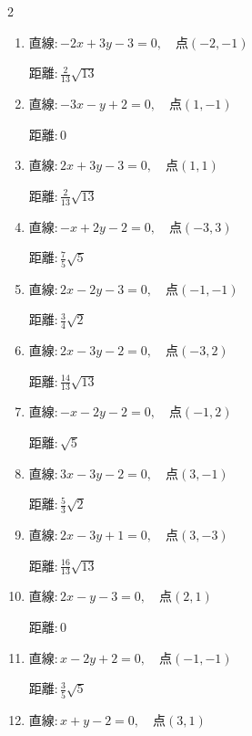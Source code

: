 \begin{multicols}{2}
\begin{enumerate}
        $\displaystyle 距離 : \frac{10}{13}\sqrt{13}$

  \item $直線:-2x+3y-3=0,\quad 点 ( -2, -1 )$

        $\displaystyle 距離 : \frac{2}{13}\sqrt{13}$

  \item $直線:-3x-y+2=0,\quad 点 ( 1, -1 )$

        $\displaystyle 距離 : 0$

\columnbreak %

\resetques

  \item $直線:2x+3y-3=0,\quad 点 ( 1, 1 )$

        $\displaystyle 距離 : \frac{2}{13}\sqrt{13}$

  \item $直線:-x+2y-2=0,\quad 点 ( -3, 3 )$

        $\displaystyle 距離 : \frac{7}{5}\sqrt{5}$

  \item $直線:2x-2y-3=0,\quad 点 ( -1, -1 )$

        $\displaystyle 距離 : \frac{3}{4}\sqrt{2}$

  \item $直線:2x-3y-2=0,\quad 点 ( -3, 2 )$

        $\displaystyle 距離 : \frac{14}{13}\sqrt{13}$

  \item $直線:-x-2y-2=0,\quad 点 ( -1, 2 )$

        $\displaystyle 距離 : \sqrt{5}$

  \item $直線:3x-3y-2=0,\quad 点 ( 3, -1 )$

        $\displaystyle 距離 : \frac{5}{3}\sqrt{2}$

  \item $直線:2x-3y+1=0,\quad 点 ( 3, -3 )$

        $\displaystyle 距離 : \frac{16}{13}\sqrt{13}$

  \item $直線:2x-y-3=0,\quad 点 ( 2, 1 )$

        $\displaystyle 距離 : 0$

  \item $直線:x-2y+2=0,\quad 点 ( -1, -1 )$

        $\displaystyle 距離 : \frac{3}{5}\sqrt{5}$

  \item $直線:x+y-2=0,\quad 点 ( 3, 1 )$


\end{enumerate}
\end{multicols}
